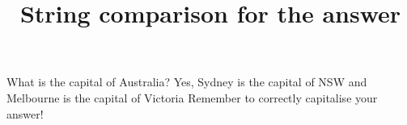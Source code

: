 \documentclass[hidesidemenu]{webquiz}
\title{String comparison for the answer}
\begin{document}
  \begin{question}     %
     What is the capital of Australia?
     \whenRight  Yes, Sydney is the capital of NSW and Melbourne is the
     capital of Victoria
     \whenWrong Remember to correctly capitalise your answer!
  \end{question}
\end{document}

